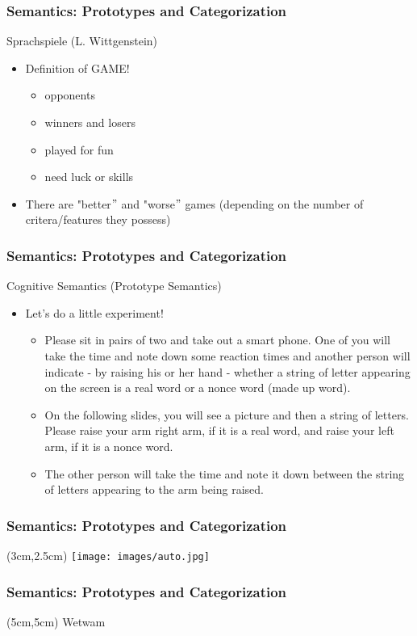 \documentclass[12pt, table]{beamer}
\begin{document}
\begin{frame}
\frametitle{Semantics: Prototypes and Categorization}
Sprachspiele (L. Wittgenstein)
\begin{itemize}
\item Definition of GAME!
\begin{itemize}
\item opponents
\item winners and losers
\item played for fun
\item need luck or skills
\end{itemize}
\item There are "better$"$ and "worse$"$ games (depending on the number of critera/features they possess)
\end{itemize}
\end{frame}

\begin{frame}
\frametitle{Semantics: Prototypes and Categorization}
Cognitive Semantics (Prototype Semantics)
\begin{itemize}
\item Let's do a little experiment!
\begin{itemize}
\item Please sit in pairs of two and take out a smart phone. One of you will take the time and note down some reaction times and another person will indicate - by raising his or her hand - whether a string of letter appearing on the screen is a real word or a nonce word (made up word).
\item On the following slides, you will see a picture and then a string of letters. Please raise your arm right arm, if it is a real word, and raise your left arm, if it is a nonce word.
\item The other person will take the time and note it down between the string of letters appearing to the arm being raised.
\end{itemize}
\end{itemize}
\end{frame}

\begin{frame}
\frametitle{Semantics: Prototypes and Categorization}
\begin{textblock*}{1cm}(3cm,2.5cm)
\texttt{[image: images/auto.jpg]}
\end{textblock*}
\end{frame}

\begin{frame}
\frametitle{Semantics: Prototypes and Categorization}
\begin{textblock*}{2cm}(5cm,5cm)
\large{Wetwam}
\end{textblock*}
\end{frame}
\end{document}
